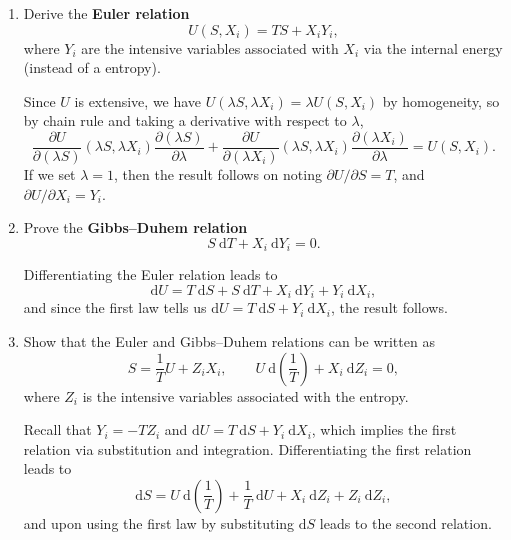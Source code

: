\documentclass[letter-paper]{tufte-book}
\newcommand\Def[1]{\textbf{#1}}
\begin{document}
\begin{enumerate}
  \item Derive the \Def{Euler relation}
  \begin{equation}
    U(S, X_i) = TS + X_i Y_i,
  \end{equation}
  where $Y_i$ are the intensive variables associated with $X_i$ via the internal
  energy (instead of a entropy).

  Since $U$ is extensive, we have $U(\lambda S, \lambda X_i) = \lambda U(S,
  X_i)$ by homogeneity, so by chain rule and taking a derivative with respect to
  $\lambda$,
  \begin{equation*}
    \frac{\partial U}{\partial (\lambda S)}(\lambda S, \lambda X_i) \frac{\partial (\lambda S)}{\partial \lambda} + \frac{\partial U}{\partial (\lambda X_i)}(\lambda S, \lambda X_i) \frac{\partial (\lambda X_i)}{\partial \lambda} = U(S, X_i).
  \end{equation*}
  If we set $\lambda = 1$, then the result follows on noting $\partial U /
  \partial S = T$, and $\partial U / \partial X_i = Y_i$.

  \item Prove the \Def{Gibbs--Duhem relation}
  \begin{equation}
    S\ \mathrm{d}T + X_i\ \mathrm{d}Y_i = 0.
  \end{equation}

  Differentiating the Euler relation leads to
  \begin{equation*}
    \mathrm{d}U = T\ \mathrm{d}S + S\ \mathrm{d}T + X_i\ \mathrm{d}Y_i + Y_i\ \mathrm{d}X_i,
  \end{equation*}
  and since the first law tells us $\mathrm{d}U = T\ \mathrm{d}S + Y_i\
\mathrm{d}X_i$, the result follows.

  \item Show that the Euler and Gibbs--Duhem relations can be written as
  \begin{equation*}
    S = \frac{1}{T} U + Z_i X_i, \qquad U\ \mathrm{d}\left(\frac{1}{T}\right) + X_i\ \mathrm{d}Z_i = 0,
  \end{equation*}
  where $Z_i$ is the intensive variables associated with the entropy.
  
  Recall that $Y_i = -T Z_i$ and $\mathrm{d}U = T\ \mathrm{d}S + Y_i\
  \mathrm{d}X_i$, which implies the first relation via substitution and
  integration. Differentiating the first relation leads to
  \begin{equation*}
    \mathrm{d}S = U\ \mathrm{d}\left(\frac{1}{T}\right) + \frac{1}{T}\ \mathrm{d}U + X_i\ \mathrm{d}Z_i + Z_i\ \mathrm{d}Z_i,
  \end{equation*}
  and upon using the first law by substituting $\mathrm{d}S$ leads to the second
  relation.
  

\end{enumerate}
\end{document}
